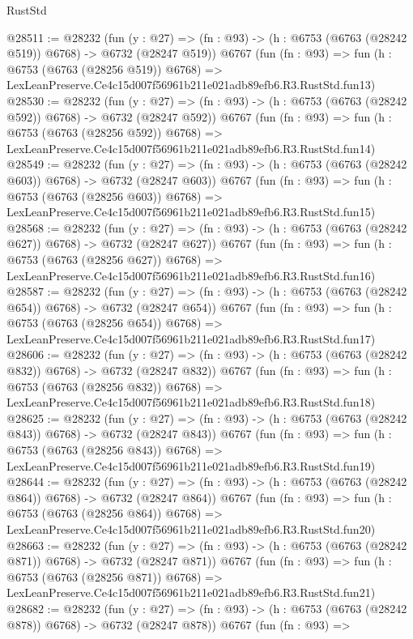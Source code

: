 \begin{lexlean}{RustStd}
\begin{coremodule}
@28511 := @28232
    (fun (y : @27) => (fn : @93) -> (h : @6753 (@6763 (@28242 @519)) @6768) -> @6732 (@28247 @519))
    @6767
    (fun (fn : @93) =>
    fun (h : @6753 (@6763 (@28256 @519)) @6768) =>
    LexLeanPreserve.Ce4c15d007f56961b211e021adb89efb6.R3.RustStd.fun13)
@28530 := @28232
    (fun (y : @27) => (fn : @93) -> (h : @6753 (@6763 (@28242 @592)) @6768) -> @6732 (@28247 @592))
    @6767
    (fun (fn : @93) =>
    fun (h : @6753 (@6763 (@28256 @592)) @6768) =>
    LexLeanPreserve.Ce4c15d007f56961b211e021adb89efb6.R3.RustStd.fun14)
@28549 := @28232
    (fun (y : @27) => (fn : @93) -> (h : @6753 (@6763 (@28242 @603)) @6768) -> @6732 (@28247 @603))
    @6767
    (fun (fn : @93) =>
    fun (h : @6753 (@6763 (@28256 @603)) @6768) =>
    LexLeanPreserve.Ce4c15d007f56961b211e021adb89efb6.R3.RustStd.fun15)
@28568 := @28232
    (fun (y : @27) => (fn : @93) -> (h : @6753 (@6763 (@28242 @627)) @6768) -> @6732 (@28247 @627))
    @6767
    (fun (fn : @93) =>
    fun (h : @6753 (@6763 (@28256 @627)) @6768) =>
    LexLeanPreserve.Ce4c15d007f56961b211e021adb89efb6.R3.RustStd.fun16)
@28587 := @28232
    (fun (y : @27) => (fn : @93) -> (h : @6753 (@6763 (@28242 @654)) @6768) -> @6732 (@28247 @654))
    @6767
    (fun (fn : @93) =>
    fun (h : @6753 (@6763 (@28256 @654)) @6768) =>
    LexLeanPreserve.Ce4c15d007f56961b211e021adb89efb6.R3.RustStd.fun17)
@28606 := @28232
    (fun (y : @27) => (fn : @93) -> (h : @6753 (@6763 (@28242 @832)) @6768) -> @6732 (@28247 @832))
    @6767
    (fun (fn : @93) =>
    fun (h : @6753 (@6763 (@28256 @832)) @6768) =>
    LexLeanPreserve.Ce4c15d007f56961b211e021adb89efb6.R3.RustStd.fun18)
@28625 := @28232
    (fun (y : @27) => (fn : @93) -> (h : @6753 (@6763 (@28242 @843)) @6768) -> @6732 (@28247 @843))
    @6767
    (fun (fn : @93) =>
    fun (h : @6753 (@6763 (@28256 @843)) @6768) =>
    LexLeanPreserve.Ce4c15d007f56961b211e021adb89efb6.R3.RustStd.fun19)
@28644 := @28232
    (fun (y : @27) => (fn : @93) -> (h : @6753 (@6763 (@28242 @864)) @6768) -> @6732 (@28247 @864))
    @6767
    (fun (fn : @93) =>
    fun (h : @6753 (@6763 (@28256 @864)) @6768) =>
    LexLeanPreserve.Ce4c15d007f56961b211e021adb89efb6.R3.RustStd.fun20)
@28663 := @28232
    (fun (y : @27) => (fn : @93) -> (h : @6753 (@6763 (@28242 @871)) @6768) -> @6732 (@28247 @871))
    @6767
    (fun (fn : @93) =>
    fun (h : @6753 (@6763 (@28256 @871)) @6768) =>
    LexLeanPreserve.Ce4c15d007f56961b211e021adb89efb6.R3.RustStd.fun21)
@28682 := @28232
    (fun (y : @27) => (fn : @93) -> (h : @6753 (@6763 (@28242 @878)) @6768) -> @6732 (@28247 @878))
    @6767
    (fun (fn : @93) =>

\end{coremodule}
\end{lexlean}
